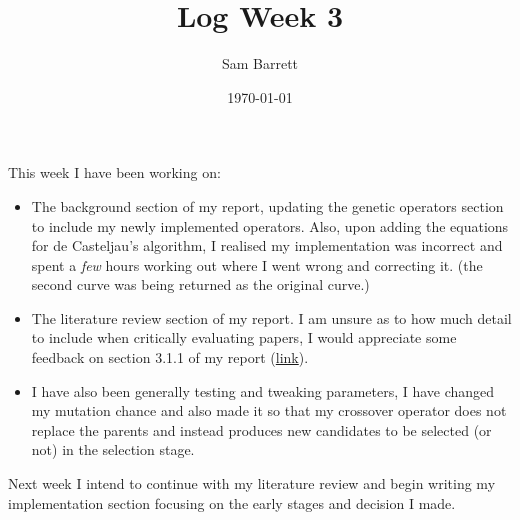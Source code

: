\documentclass[11pt]{article}
\author{Sam Barrett}
\date{\today}
\title{Log Week 3}
\begin{document}
\maketitle
This week I have been working on:

\begin{itemize}
\item The background section of my report, updating the genetic operators section to include my newly implemented operators.
Also, upon adding the equations for de Casteljau's algorithm, I realised my implementation was incorrect and spent a \emph{few} hours working out where I went wrong and correcting it. (the second curve was being returned as the original curve.)
\item The literature review section of my report. I am unsure as to how much detail to include when critically evaluating papers, I would appreciate some feedback on section 3.1.1 of my report (\href{https://sambarrett.online/Y4-Diss/report.pdf}{link}).
\item I have also been generally testing and tweaking parameters, I have changed my mutation chance and also made it so that my crossover operator does not replace the parents and instead produces new candidates to be selected (or not) in the selection stage.
\end{itemize}


Next week I intend to continue with my literature review and begin writing my implementation section focusing on the early stages and decision I made.
\end{document}
